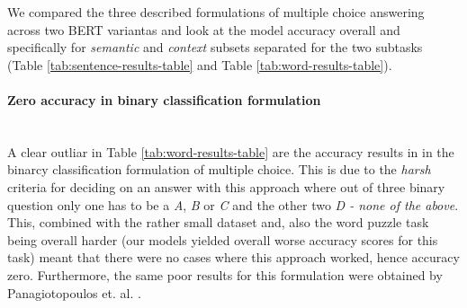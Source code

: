 We compared the three described formulations of multiple choice answering across two BERT variantas and look at the model accuracy overall and specifically for \emph{semantic} and \emph{context} subsets separated for the two subtasks (Table \ref{tab:sentence-results-table} and Table \ref{tab:word-results-table}).

\paragraph{Zero accuracy in binary classification formulation} \\ %
A clear outliar in Table \ref{tab:word-results-table} are the accuracy results in in the binarcy classification formulation of multiple choice.
This is due to the \emph{harsh} criteria for deciding on an answer with this approach where out of three binary question only one has to be a \emph{A}, \emph{B} or \emph{C} and the other two \emph{D - none of the above}. This, combined with the rather small dataset and, also the word puzzle task being overall harder (our models yielded overall worse accuracy scores for this task) meant that there were no cases where this approach worked, hence accuracy zero.
Furthermore, the same poor results for this formulation were obtained by Panagiotopoulos et. al. \citep{ails-lab}.
